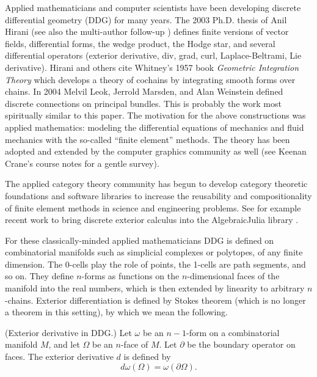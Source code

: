 Applied mathematicians and computer scientists have been developing
discrete differential geometry (DDG) for many years. The 2003 Ph.D.
thesis of Anil Hirani \cite{hiranidec} (see also the multi-author
follow-up \cite{desbrundec}) defines finite versions of vector fields,
differential forms, the wedge product, the Hodge star, and several
differential operators (exterior derivative, div, grad, curl,
Laplace-Beltrami, Lie derivative). Hirani and others cite Whitney's 1957
book \emph{Geometric Integration Theory}\cite{whitney1957} which
develops a theory of cochains by integrating smooth forms over chains.
In 2004 Melvil Leok, Jerrold Marsden, and Alan Weinstein \cite{leok}
defined discrete connections on principal bundles. This is probably the
work most spiritually similar to this paper. The motivation for the
above constructions was applied mathematics: modeling the differential
equations of mechanics and fluid mechanics with the so-called ``finite
element'' methods. The theory has been adopted and extended by the
computer graphics community as well (see Keenan Crane's course notes
\cite{crane_ddg} for a gentle survey).

The applied category theory community has begun to develop category
theoretic foundations and software libraries to increase the reusability
and compositionality of finite element methods in science and
engineering problems. See for example recent work to bring discrete
exterior calculus into the AlgebraicJulia library
\cite{morris_decapodes} \cite{patterson_diffeq}.

For these classically-minded applied mathematicians DDG is defined on
combinatorial manifolds such as simplicial complexes or polytopes, of
any finite dimension. The 0-cells play the role of points, the 1-cells
are path segments, and so on. They define \(n\)-forms as functions on
the \(n\)-dimensional faces of the manifold into the real numbers, which
is then extended by linearity to arbitrary \(n\)-chains. Exterior
differentiation is defined by Stokes theorem (which is no longer a
theorem in this setting), by which we mean the following.

\begin{mydef}
(Exterior derivative in DDG.) Let \( \omega \) be an \( n-1 \)-form on a combinatorial manifold \( M \), and let \( \Omega \) be an \( n \)-face of \( M \). Let \( \partial \) be the boundary operator on faces. The exterior derivative \( d \) is defined by 
\[ 
 d\omega(\Omega) = \omega(\partial\Omega).
\]
\end{mydef}


